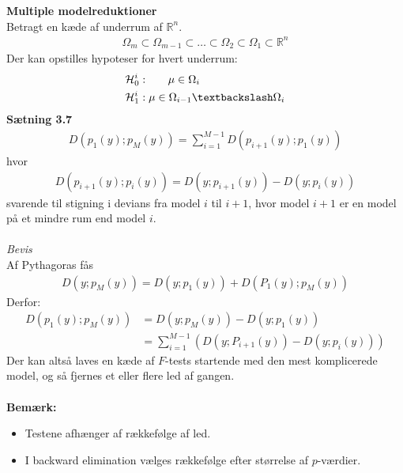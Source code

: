 \documentclass[12pt,a4paper]{report}
\begin{document}
\textbf{Multiple modelreduktioner}\\
Betragt en kæde af underrum af $\mathbb{R}^n$.
\begin{align*}
\Omega_m\subset\Omega_{m-1}\subset\ldots\subset\Omega_2\subset\Omega_1\subset\mathbb{R}^n
\end{align*}
Der kan opstilles hypoteser for hvert underrum:
\begin{align*}
\mathcal{H}^i_0&:\phantom{mm}\mu\in\Omega_i\\
\mathcal{H}^i_1&:\mu\in\Omega_{i-1}\textbackslash\Omega_i
\end{align*}
\textbf{Sætning 3.7}
\begin{align*}
D(p_1(y);p_M(y))=\sum_{i=1}^{M-1}D(p_{i+1}(y);p_1(y))
\end{align*}
hvor
\begin{align*}
D(p_{i+1}(y);p_i(y))=D(y;p_{i+1}(y))-D(y;p_i(y))
\end{align*}
svarende til stigning i devians fra model $i$ til $i+1$, hvor model $i+1$ er en model på et mindre rum end model $i$.\\\\
\textit{Bevis}\\
Af Pythagoras fås
\begin{align*}
D(y;p_M(y))=D(y;p_1(y))+D(P_1(y);p_M(y))
\end{align*}
Derfor:
\begin{align*}
D(p_1(y);p_M(y))&=D(y;p_M(y))-D(y;p_1(y))\\
&=\sum_{i=1}^{M-1}\left(D(y;P_{i+1}(y))-D(y;p_i(y))\right)
\end{align*}
Der kan altså laves en kæde af $F$-tests startende med den mest komplicerede model, og så fjernes et eller flere led af gangen.\\\\
\textbf{Bemærk:}
\begin{itemize}
\item Testene afhænger af rækkefølge af led.
\item I backward elimination vælges rækkefølge efter størrelse af $p$-værdier.
\end{itemize}
\end{document}
